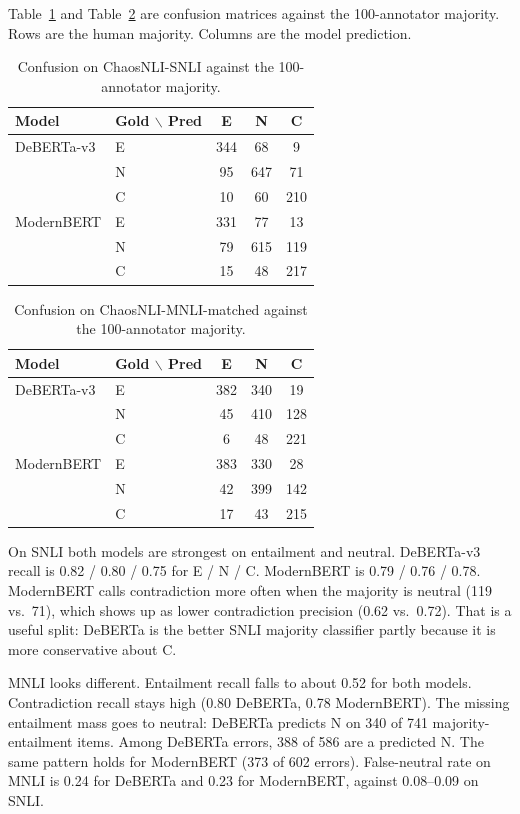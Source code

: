 \documentclass[11pt,a4paper]{article}
\begin{document}
Table~\ref{tab:conf-snli} and Table~\ref{tab:conf-mnli} are confusion matrices against the 100-annotator majority. Rows are the human majority. Columns are the model prediction.

\begin{table}[H]
\centering
\small
\caption{Confusion on ChaosNLI-SNLI against the 100-annotator majority.}
\label{tab:conf-snli}
\begin{tabular}{llccc}
\toprule
Model & Gold $\backslash$ Pred & E & N & C \\
\midrule
DeBERTa-v3 & E & 344 & 68 & 9 \\
 & N & 95 & 647 & 71 \\
 & C & 10 & 60 & 210 \\
\midrule
ModernBERT & E & 331 & 77 & 13 \\
 & N & 79 & 615 & 119 \\
 & C & 15 & 48 & 217 \\
\bottomrule
\end{tabular}
\end{table}

\begin{table}[H]
\centering
\small
\caption{Confusion on ChaosNLI-MNLI-matched against the 100-annotator majority.}
\label{tab:conf-mnli}
\begin{tabular}{llccc}
\toprule
Model & Gold $\backslash$ Pred & E & N & C \\
\midrule
DeBERTa-v3 & E & 382 & 340 & 19 \\
 & N & 45 & 410 & 128 \\
 & C & 6 & 48 & 221 \\
\midrule
ModernBERT & E & 383 & 330 & 28 \\
 & N & 42 & 399 & 142 \\
 & C & 17 & 43 & 215 \\
\bottomrule
\end{tabular}
\end{table}

On SNLI both models are strongest on entailment and neutral. DeBERTa-v3 recall is 0.82 / 0.80 / 0.75 for E / N / C. ModernBERT is 0.79 / 0.76 / 0.78. ModernBERT calls contradiction more often when the majority is neutral (119 vs.\ 71), which shows up as lower contradiction precision (0.62 vs.\ 0.72). That is a useful split: DeBERTa is the better SNLI majority classifier partly because it is more conservative about C.

MNLI looks different. Entailment recall falls to about 0.52 for both models. Contradiction recall stays high (0.80 DeBERTa, 0.78 ModernBERT). The missing entailment mass goes to neutral: DeBERTa predicts N on 340 of 741 majority-entailment items. Among DeBERTa errors, 388 of 586 are a predicted N. The same pattern holds for ModernBERT (373 of 602 errors). False-neutral rate on MNLI is 0.24 for DeBERTa and 0.23 for ModernBERT, against 0.08--0.09 on SNLI.
\end{document}
